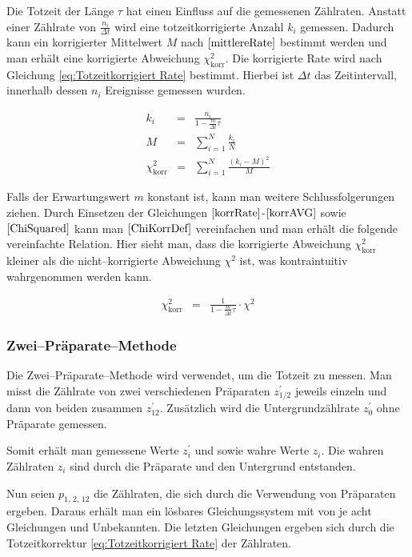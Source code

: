 \documentclass[12pt,a4paper]{scrartcl}
\numberwithin{equation}{section} %
\begin{document}
Die Totzeit der Länge $\tau$ hat einen Einfluss auf die gemessenen Zählraten. Anstatt einer Zählrate von $\frac{n_i}{\Delta t}$ wird eine totzeitkorrigierte Anzahl $k_i$ gemessen. Dadurch kann ein korrigierter Mittelwert $M$ nach $\eqref{mittlereRate}$ bestimmt werden und man erhält eine korrigierte Abweichung $\chi^2_\mathrm{korr}$. Die korrigierte Rate wird nach Gleichung \eqref{eq:Totzeitkorrigiert Rate} bestimmt. Hierbei ist $\Delta t$ das Zeitintervall, innerhalb dessen $n_i$ Ereignisse gemessen wurden.

\begin{eqnarray}
    k_i &=&
        \frac{
            n_i
        }{
            1 - \frac{m}{\Delta t}\tau
        } \label{korrRate} \\
    M &=& \sum_{i=1}^N \frac{k_i}{N} \label{korrAVG} \\
    \chi^2_\mathrm{korr} &=& \sum_{i=1}^N
        \frac{(k_i - M)^2}{M} \label{ChiKorrDef}
\end{eqnarray}

\noindent
Falls der Erwartungswert $m$ konstant ist, kann man weitere Schlussfolgerungen ziehen. Durch Einsetzen der Gleichungen $\eqref{korrRate}$-$\eqref{korrAVG}$ sowie $\eqref{ChiSquared}$ kann man $\eqref{ChiKorrDef}$ vereinfachen und man erhält die folgende vereinfachte Relation. Hier sieht man, dass die korrigierte Abweichung $\chi^2_\mathrm{korr}$ kleiner als die nicht--korrigierte Abweichung $\chi^2$ ist, was kontraintuitiv wahrgenommen werden kann.

\begin{eqnarray}
    \chi^2_\mathrm{korr} &=&
        \frac{1}{1 - \frac{m}{\Delta t}\tau} \cdot \chi^2 \label{eq:Chi^2 korr}
\end{eqnarray}

\subsubsection{Zwei--Präparate--Methode}
Die Zwei--Präparate--Methode wird verwendet, um die Totzeit zu messen. Man misst die Zählrate von zwei verschiedenen Präparaten $z^\prime_{1/2}$ jeweils einzeln und dann von beiden zusammen $z^\prime_{12}$. Zusätzlich wird die Untergrundzählrate $z^\prime_0$ ohne Präparate gemessen.

Somit erhält man gemessene Werte $z^\prime_i$ und sowie wahre Werte $z_i$. Die wahren Zählraten $z_i$ sind durch die Präparate und den Untergrund entstanden.

Nun seien $p_{1,\,2,\,12}$ die Zählraten, die sich durch die Verwendung von Präparaten ergeben. Daraus erhält man ein lösbares Gleichungssystem mit von je acht Gleichungen und Unbekannten.  Die letzten Gleichungen ergeben sich durch die Totzeitkorrektur \eqref{eq:Totzeitkorrigiert Rate} der Zählraten.
\end{document}
